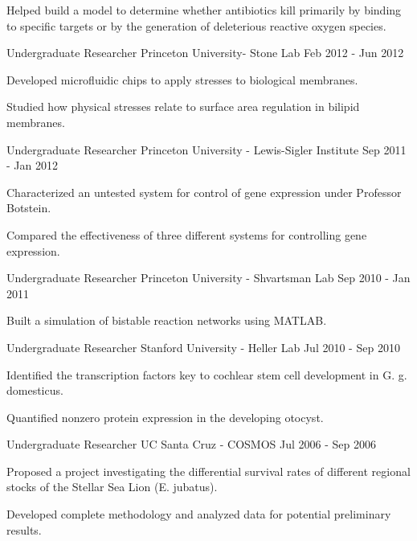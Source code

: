 \begin{cventries}
{\begin{cvitems}
        \item Helped build a model to determine whether antibiotics kill primarily by binding to specific targets or by the generation of deleterious reactive oxygen species.
      \end{cvitems}
    }
  \cventry
    {Undergraduate Researcher} %
    {Princeton University- Stone Lab} %
    {} %
    {Feb 2012 - Jun 2012} %
{
      \begin{cvitems} %
        \item Developed microfluidic chips to apply stresses to biological membranes.
        \item Studied how physical stresses relate to surface area regulation in bilipid membranes.
      \end{cvitems}
    }
  \cventry
    {Undergraduate Researcher} %
    {Princeton University - Lewis-Sigler Institute} %
    {} %
    {Sep 2011 - Jan 2012} %
{
      \begin{cvitems} %
        \item Characterized an untested system for control of gene expression under Professor Botstein.
        \item Compared the effectiveness of three different systems for controlling gene expression.
      \end{cvitems}
    }
  \cventry
    {Undergraduate Researcher} %
    {Princeton University - Shvartsman Lab} %
    {} %
    {Sep 2010 - Jan 2011} %
{
      \begin{cvitems} %
        \item Built a simulation of bistable reaction networks using MATLAB.
      \end{cvitems}
    }
  \cventry
    {Undergraduate Researcher} %
    {Stanford University - Heller Lab} %
    {} %
    {Jul 2010 - Sep 2010} %
{
      \begin{cvitems} %
        \item Identified the transcription factors key to cochlear stem cell development in G. g. domesticus.
        \item Quantified nonzero protein expression in the developing otocyst.
      \end{cvitems}
    }
  \cventry
    {Undergraduate Researcher} %
    {UC Santa Cruz - COSMOS} %
    {} %
    {Jul 2006 - Sep 2006} %
{
      \begin{cvitems} %
        \item Proposed a project investigating the differential survival rates of different regional stocks of the Stellar Sea Lion (E. jubatus).
        \item Developed complete methodology and analyzed data for potential preliminary results.
      \end{cvitems}
    }
\end{cventries}